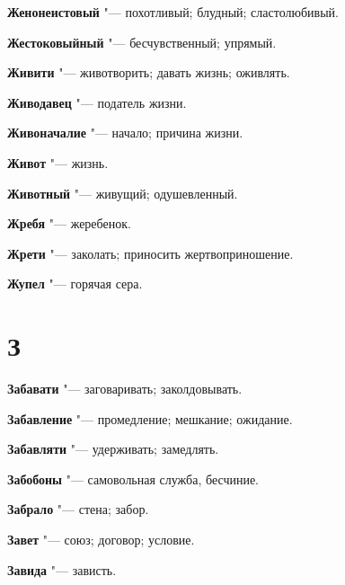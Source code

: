 \begin{mymulticols}{2}
\noindent\textbf{Женонеистовый} "--- похотливый; блудный; сластолюбивый. 




\noindent\textbf{Жестоковыйный} "--- бесчувственный; упрямый. 




\noindent\textbf{Живити} "--- животворить; давать жизнь; оживлять. 




\noindent\textbf{Живодавец} "--- податель жизни. 




\noindent\textbf{Живоначалие} "--- начало; причина жизни. 




\noindent\textbf{Живот} "--- жизнь. 




\noindent\textbf{Животный} "--- живущий; одушевленный. 




\noindent\textbf{Жребя} "--- жеребенок. 




\noindent\textbf{Жрети} "--- заколать; приносить жертвоприношение. 




\noindent\textbf{Жупел} "--- горячая сера. 




\section{З} 





\noindent\textbf{Забавати} "--- заговаривать; заколдовывать. 




\noindent\textbf{Забавление} "--- промедление; мешкание; ожидание. 




\noindent\textbf{Забавляти} "--- удерживать; замедлять. 




\noindent\textbf{Забобоны} "--- самовольная служба, бесчиние. 




\noindent\textbf{Забрало} "--- стена; забор. 




\noindent\textbf{Завет} "--- союз; договор; условие. 




\noindent\textbf{Завида} "--- зависть. 





\end{mymulticols}
